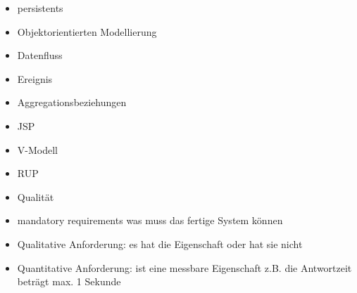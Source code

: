 \begin{itemize}
\item persistents
\item Objektorientierten Modellierung
\item Datenfluss
\item Ereignis
\item Aggregationsbeziehungen
\item JSP
\item V-Modell
\item RUP
\item Qualität
\item mandatory requirements was muss das fertige System können
\item Qualitative Anforderung: es hat die Eigenschaft oder hat sie nicht
\item Quantitative Anforderung: ist eine messbare Eigenschaft z.B. die Antwortzeit beträgt max. 1 Sekunde


\end{itemize}